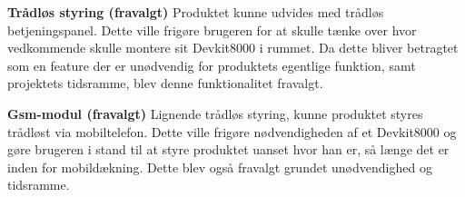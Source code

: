 \textbf{Trådløs styring (fravalgt)}
Produktet kunne udvides med trådløs betjeningspanel. Dette ville frigøre brugeren for at skulle tænke over hvor vedkommende skulle montere sit Devkit8000 i rummet. Da dette bliver betragtet som en feature der er unødvendig for produktets egentlige funktion, samt projektets tidsramme, blev denne funktionalitet fravalgt.  

\textbf{Gsm-modul (fravalgt)}
Lignende trådløs styring, kunne produktet styres trådløst via mobiltelefon. Dette ville frigøre nødvendigheden af et Devkit8000 og gøre brugeren i stand til at styre produktet uanset hvor han er, så længe det er inden for mobildækning. Dette blev også fravalgt grundet unødvendighed og tidsramme. 

